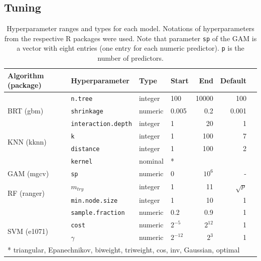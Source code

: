 \documentclass[review]{elsarticle}
\begin{document}
\subsection{Tuning}
\label{subsec:methods_tuning}

\begin{table}[b!]
\centering
\caption[t]{Hyperparameter ranges and types for each model.
	Notations of hyperparameters from the respective R packages were used.
	Note that parameter \texttt{sp} of the GAM is a vector with eight entries (one entry for each numeric predictor). \texttt{p} is the number of predictors.}
\begingroup\footnotesize
\begin{tabular}{llllrrr}
	\\
	Algorithm (package)            & Hyperparameter             & Type    & Start     & End      & Default    \\
	\hline
	\multirow{3}{*}{BRT (gbm)}     & \texttt{n.tree}            & integer & 100       & 10000    & 100        \\
	                               & \texttt{shrinkage}         & numeric & 0.005         & 0.2     & 0.001      \\
	                               & \texttt{interaction.depth} & integer & 1         & 20       & 1          \\
	\midrule
	\multirow{2}{*}{KNN (kknn)}    & \texttt{k}                 & integer & 1         & 100      & 7          \\
								   & \texttt{distance}          & integer & 1         & 100      & 2          \\
								   & \texttt{kernel}            & nominal & *     &           &          \\
	\midrule
	\multirow{1}{*}{GAM (mgcv)}    & \texttt{sp}                & numeric & 0         & $10^{6}$ & -          \\
	\midrule
	\multirow{2}{*}{RF (ranger)}   & \texttt{$m_{try}$}              & integer & 1         & 11       & $\sqrt{p}$ \\
	                               & \texttt{min.node.size}     & integer & 1         & 10       & 1          \\
	                               & \texttt{sample.fraction}   & numeric & 0.2       & 0.9      & 1          \\
	\midrule
	\multirow{2}{*}{SVM (e1071)} & \texttt{cost}                 & numeric & $2^{-5}$ & $2^{12}$ & 1          \\
	                               & \texttt{$\gamma$}          & numeric & $2^{-12}$ & $2^{3}$ & 1          \\
	\bottomrule
	\multicolumn{6}{l}{* triangular, Epanechnikov, biweight, triweight, cos, inv, Gaussian, optimal}     \\
\end{tabular}
\endgroup
\label{tab:hyperparameter_limits}
\end{table}
\end{document}
